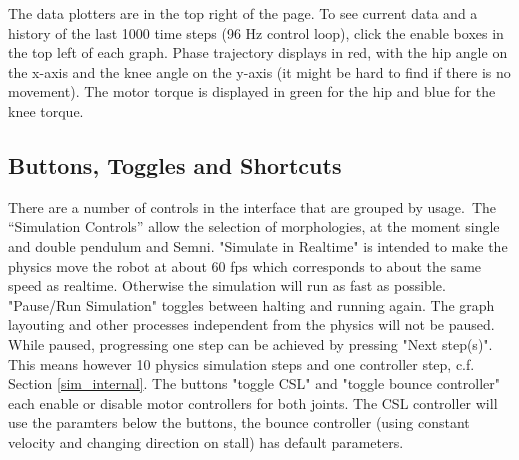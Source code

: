 \documentclass[10pt,a4paper]{article}
\begin{document}
The data plotters are in the top right of the page.
To see current data and a history of the last 1000 time steps (96 Hz control loop), click the enable boxes in the top left of each graph. Phase trajectory displays in red, with the hip angle on the x-axis and the knee angle on the y-axis (it might be hard to find if there is no movement). The motor torque is displayed in green for the hip and blue for the knee torque.

\subsection{Buttons, Toggles and Shortcuts}

There are a number of controls in the interface that are grouped by usage.\
The ``Simulation Controls'' allow the selection of morphologies, at the moment single and double pendulum and Semni. "Simulate in Realtime" is intended to make the physics move the robot at about 60 fps which corresponds to about the same speed as realtime. Otherwise the simulation will run as fast as possible.
"Pause/Run Simulation" toggles between halting and running again. The graph layouting and other processes independent from the physics will not be paused. While paused, progressing one step can be achieved by pressing "Next step(s)". This means however 10 physics simulation steps and one controller step, c.f. Section \ref{sim_internal}.
The buttons "toggle CSL" and "toggle bounce controller" each enable or disable motor controllers for both joints. The CSL controller will use the paramters below the buttons, the bounce controller (using constant velocity and changing direction on stall) has default parameters.
\end{document}
